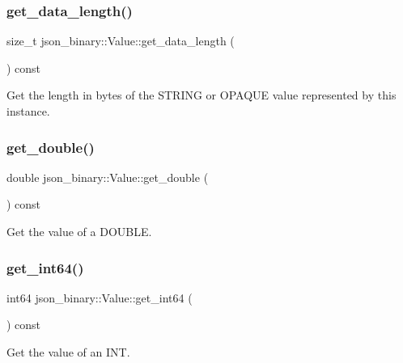 \subsubsection{\texorpdfstring{get\+\_\+data\+\_\+length()}{get\_data\_length()}}
{\footnotesize\ttfamily size\+\_\+t json\+\_\+binary\+::\+Value\+::get\+\_\+data\+\_\+length (\begin{DoxyParamCaption}{ }\end{DoxyParamCaption}) const}

Get the length in bytes of the S\+T\+R\+I\+NG or O\+P\+A\+Q\+UE value represented by this instance. \mbox{\label{classjson__binary_1_1Value_ac0e1aaddd94b4e96ef8e595a503dd5f2}} 
\subsubsection{\texorpdfstring{get\+\_\+double()}{get\_double()}}
{\footnotesize\ttfamily double json\+\_\+binary\+::\+Value\+::get\+\_\+double (\begin{DoxyParamCaption}{ }\end{DoxyParamCaption}) const}

Get the value of a D\+O\+U\+B\+LE. \mbox{\label{classjson__binary_1_1Value_aac42ffa1dc718f9b86a173f0c9fdefa2}} 
\subsubsection{\texorpdfstring{get\+\_\+int64()}{get\_int64()}}
{\footnotesize\ttfamily int64 json\+\_\+binary\+::\+Value\+::get\+\_\+int64 (\begin{DoxyParamCaption}{ }\end{DoxyParamCaption}) const}

Get the value of an I\+NT. \mbox{\label{classjson__binary_1_1Value_a26f39e9400007bb4df9461858a45e4ed}} 
